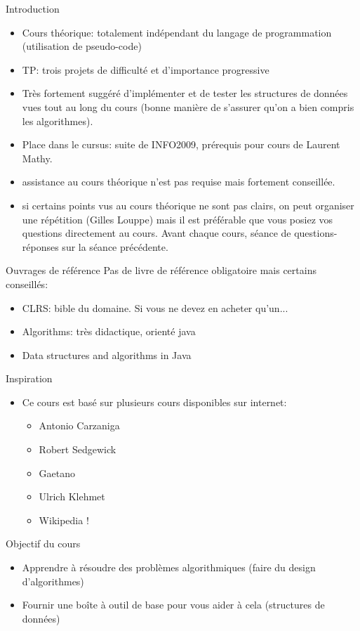 
\begin{frame}{Introduction}

\begin{itemize}
\item Cours théorique: totalement indépendant du langage de programmation (utilisation de pseudo-code)
\item TP: trois projets de difficulté et d'importance progressive
\item Très fortement suggéré d'implémenter et de tester les structures de données vues tout au long du cours (bonne manière de s'assurer qu'on a bien compris les algorithmes).
\item Place dans le cursus: suite de INFO2009, prérequis pour cours de Laurent Mathy.
\item assistance au cours théorique n'est pas requise mais fortement conseillée.
\item si certains points vus au cours théorique ne sont pas clairs, on peut organiser une répétition (Gilles Louppe) mais il est préférable que vous posiez vos questions directement au cours. Avant chaque cours, séance de questions-réponses sur la séance précédente.
\end{itemize}

\end{frame}

\begin{frame}{Ouvrages de référence}
Pas de livre de référence obligatoire mais certains conseillés:
\begin{itemize}
\item CLRS: bible du domaine. Si vous ne devez en acheter qu'un...
\item Algorithms: très didactique, orienté java
\item Data structures and algorithms in Java
\end{itemize}
\end{frame}

\begin{frame}{Inspiration}
\begin{itemize}
\item Ce cours est basé sur plusieurs cours disponibles sur internet:
\begin{itemize}
\item Antonio Carzaniga
\item Robert Sedgewick
\item Gaetano
\item Ulrich Klehmet
\item Wikipedia !
\end{itemize}
\end{itemize}
\end{frame}

\begin{frame}{Objectif du cours}

\begin{itemize}
\item Apprendre à résoudre des problèmes algorithmiques (faire du
  design d'algorithmes)
\item Fournir une boîte à outil de base pour vous aider à cela
  (structures de données)
\end{itemize}

\end{frame}
